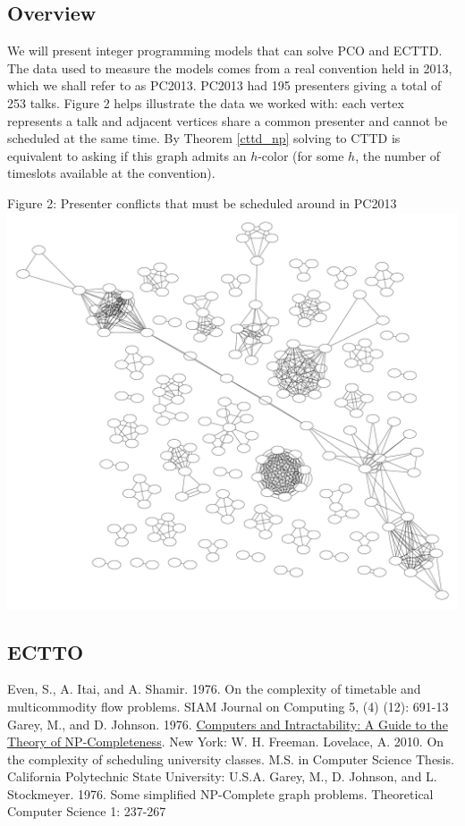 \documentclass[]{article}
\theoremstyle{definition}
\theoremstyle{remark}
\numberwithin{equation}{section}
\begin{document}
\subsection{Overview}
We will present integer programming models that can solve PCO and ECTTD. The data used to measure the models comes from a real convention held in 2013, which we shall refer to as PC2013. PC2013 had 195 presenters giving a total of 253 talks. Figure 2 helps illustrate the data we worked with: each vertex represents a talk and adjacent vertices share a common presenter and cannot be scheduled at the same time. By Theorem \ref{cttd_np} solving to CTTD is equivalent to asking if this graph admits an $h$-color (for some $h$, the number of timeslots available at the convention).
\begin{center}
Figure 2: Presenter conflicts that must be scheduled around in PC2013 \\
\includegraphics[scale=0.2]{penguiconconflict}
\end{center}

\subsection{ECTTO}
\begin{center}

\end{center}


\begin{thebibliography}{9}
  Even, S., A. Itai, and A. Shamir. 1976. On the complexity of timetable and multicommodity flow problems. SIAM Journal on Computing 5, (4) (12): 691-13
  Garey, M., and D. Johnson. 1976. \underline{Computers and Intractability: A Guide to the Theory of NP-Completeness}. New York: W. H. Freeman.
  Lovelace, A. 2010. On the complexity of scheduling university classes. M.S. in Computer Science Thesis. California Polytechnic State University: U.S.A.	
  Garey, M., D. Johnson, and L. Stockmeyer. 1976. Some simplified NP-Complete graph problems. Theoretical Computer Science 1: 237-267
\end{thebibliography}
\end{document}
